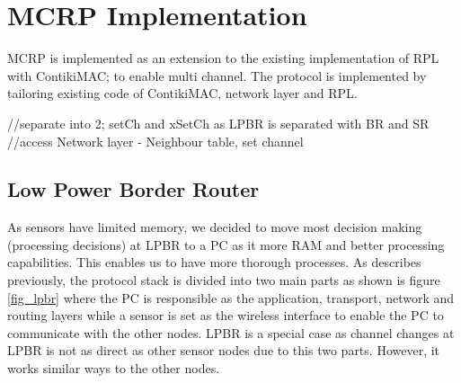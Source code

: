 \section{MCRP Implementation}
MCRP is implemented as an extension to the existing implementation of RPL with ContikiMAC; to enable multi channel.
The protocol is implemented by tailoring existing code of ContikiMAC, network layer and RPL.

//separate into 2; setCh and xSetCh as LPBR is separated with BR and SR
//access Network layer - Neighbour table, set channel

\subsection{Low Power Border Router}
As sensors have limited memory, we decided to move most decision making (processing decisions) at LPBR to a PC as it more RAM and better processing capabilities. This enables us to have more thorough processes. As describes previously, the protocol stack is divided into two main parts as shown is figure \ref{fig_lpbr} where the PC is responsible as the application, transport, network and routing layers while a sensor is set as the wireless interface to enable the PC to communicate with the other nodes. LPBR is a special case as channel changes at LPBR is not as direct as other sensor nodes due to this two parts. However, it works similar ways to the other nodes.

